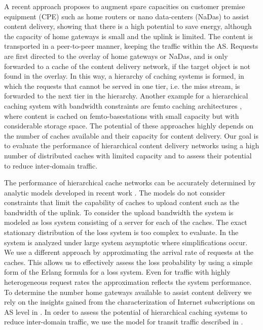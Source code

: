 A recent approach \cite{valancius2009greening} proposes to augment spare capacities on customer premise equipment (CPE) such as home routers or nano data-centers (NaDas) to assist content delivery, showing that there is a high potential to save energy, although the capacity of home gateways is small and the uplink is limited.
The content is transported in a peer-to-peer manner, keeping the traffic within the AS.
Requests are first directed to the overlay of home gateways or NaDas, and is only forwarded to a cache of the content delivery network, if the target object is not found in the overlay.
In this way, a hierarchy of caching systems is formed, in which the requests that cannot be served in one tier, i.e. the miss stream, is forwarded to the next tier in the hierarchy.
Another example for a hierarchical caching system with bandwidth constraints are femto caching architectures \cite{golrezaei2013femtocaching}, where content is cached on femto-basestations with small capacity but with considerable storage space.
The potential of these approaches highly depends on the number of caches available and their capacity for content delivery.
Our goal is to evaluate the performance of hierarchical content delivery networks using a high number of distributed caches with limited capacity and to assess their potential to reduce inter-domain traffic.



The performance of hierarchical cache networks can be accurately determined by analytic models developed in recent work \cite{che2002hierarchical, martina2014unified}.
The models do not consider constraints that limit the capability of caches to upload content such as the bandwidth of the uplink.
To consider the upload bandwidth the system is modeled as loss system consisting of a server for each of the caches. The exact stationary distribution of the loss system is too complex to evaluate.
In \cite{tan2013optimal} the system is analyzed under large system asymptotic where simplifications occur.
We use a different approach by approximating the arrival rate of requests at the caches.
This allows us to effectively assess the loss probability by using a simple form of the Erlang formula for a loss system.
Even for traffic with highly heterogeneous request rates the approximation reflects the system performance.
To determine the number home gateways available to assist content delivery we rely on the insights gained from the characterization of Internet subscriptions on AS level in .
 In order to assess the potential of hierarchical caching systems to reduce inter-domain traffic, we use the model for transit traffic described in .

